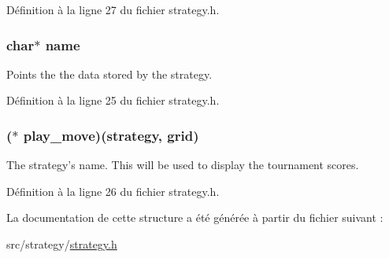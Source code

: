 Définition à la ligne 27 du fichier strategy.h.

\hypertarget{structstrategy__s_a5ac083a645d964373f022d03df4849c8}{
\subsubsection[{name}]{\setlength{\rightskip}{0pt plus 5cm}char$\ast$ {\bf name}}}
\label{structstrategy__s_a5ac083a645d964373f022d03df4849c8}
Points the the data stored by the strategy. 

Définition à la ligne 25 du fichier strategy.h.

\hypertarget{structstrategy__s_ac4ec2cfabdd3e4b516c4164f83008809}{
\subsubsection[{play\_\-move}]{($\ast$ {\bf play\_\-move})({\bf strategy}, {\bf grid})}}
\label{structstrategy__s_ac4ec2cfabdd3e4b516c4164f83008809}
The strategy's name. This will be used to display the tournament scores. 

Définition à la ligne 26 du fichier strategy.h.



La documentation de cette structure a été générée à partir du fichier suivant :\begin{DoxyCompactItemize}
\item 
src/strategy/\hyperlink{strategy_8h}{strategy.h}\end{DoxyCompactItemize}
